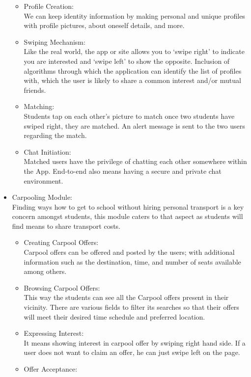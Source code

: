\begin{itemize}
\begin{itemize}
\item Profile Creation: \\
We can keep identity information by making personal and unique profiles with profile pictures, about oneself details, and more.
\item Swiping Mechanism: \\
Like the real world, the app or site allows you to ‘swipe right’ to indicate you are interested and ‘swipe left’ to show the opposite.
Inclusion of algorithms through which the application can identify the list of profiles with, which the user is likely to share a common interest and/or mutual friends.
\item Matching: \\
Students tap on each other’s picture to match once two students have swiped right, they are matched.
An alert message is sent to the two users regarding the match.
\item Chat Initiation: \\
Matched users have the privilege of chatting each other somewhere within the App.
End-to-end also means having a secure and private chat environment.
\end{itemize}
\item Carpooling Module: \\
Finding ways how to get to school without hiring personal transport is a key concern amongst students, this module caters to that aspect as students will find means to share transport costs.\\
\begin{itemize}
\item Creating Carpool Offers: \\
Carpool offers can be offered and posted by the users; with additional information such as the destination, time, and number of seats available among others.
\item Browsing Carpool Offers: \\
This way the students can see all the Carpool offers present in their vicinity.
There are various fields to filter its searches so that their offers will meet their desired time schedule and preferred location.
\item Expressing Interest: \\
It means showing interest in carpool offer by swiping right hand side.
If a user does not want to claim an offer, he can just swipe left on the page.
\item Offer Acceptance: \\

\end{itemize}
\end{itemize}
